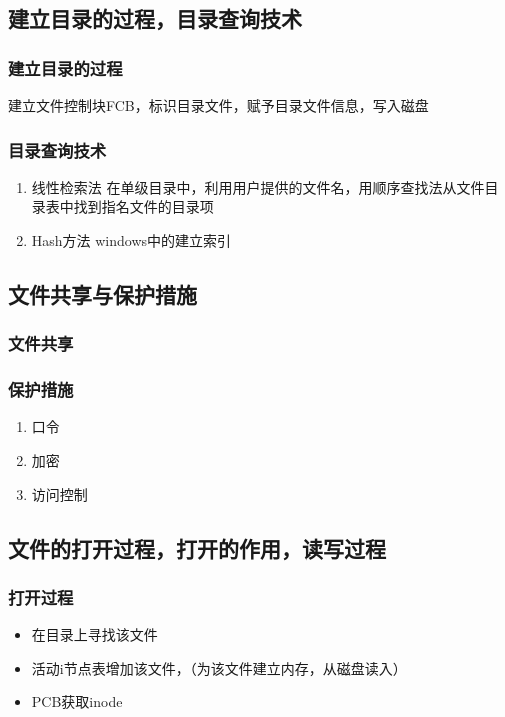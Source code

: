 \documentclass[11pt]{article}
\begin{document}
\subsection{建立目录的过程，目录查询技术}
\label{sec-4-4}
\subsubsection{建立目录的过程}
\label{sec-4-4-1}
建立文件控制块FCB，标识目录文件，赋予目录文件信息，写入磁盘
\subsubsection{目录查询技术}
\label{sec-4-4-2}
\begin{enumerate}
\item 线性检索法
\label{sec-4-4-2-1}
在单级目录中，利用用户提供的文件名，用顺序查找法从文件目录表中找到指名文件的目录项
\item Hash方法
\label{sec-4-4-2-2}
windows中的建立索引
\end{enumerate}
\subsection{文件共享与保护措施}
\label{sec-4-5}
\subsubsection{文件共享}
\label{sec-4-5-1}
\subsubsection{保护措施}
\label{sec-4-5-2}
\begin{enumerate}
\item 口令
\label{sec-4-5-2-1}
\item 加密
\label{sec-4-5-2-2}
\item 访问控制
\label{sec-4-5-2-3}
\end{enumerate}
\subsection{文件的打开过程，打开的作用，读写过程}
\label{sec-4-6}
\subsubsection{打开过程}
\label{sec-4-6-1}
\begin{itemize}
\item 在目录上寻找该文件
\item 活动i节点表增加该文件，（为该文件建立内存，从磁盘读入）
\item PCB获取inode
\end{itemize}
\end{document}
